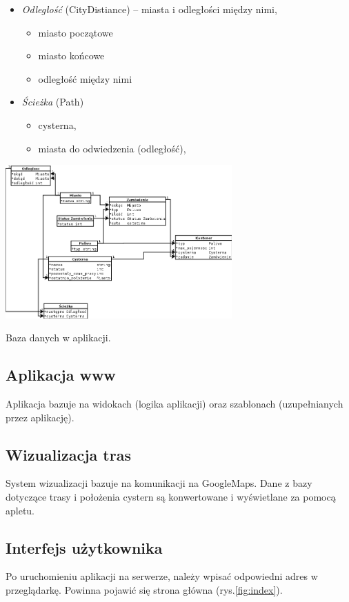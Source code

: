 \documentclass[11pt,a4paper,oneside]{mwart}
\begin{document}
\begin{itemize}
\begin{itemize}
    \end{itemize}
    \item \emph{Odległość} (CityDistiance) -- miasta i odległości między nimi,
    \begin{itemize}
      \item miasto początowe
      \item miasto końcowe
      \item odległość między nimi
    \end{itemize}
    \item \emph{Ścieżka} (Path) 
    \begin{itemize}
      \item cysterna,
      \item miasta do odwiedzenia (odległość),
    \end{itemize}
\end{itemize}

\begin{schemat}
  \centering
  \includegraphics[width=0.65\textwidth]{pics/baza.png}
  \caption{Baza danych w aplikacji.}
  \label{fig:baza}
\end{schemat}

\subsection{Aplikacja www}
Aplikacja bazuje na widokach (logika aplikacji) oraz szablonach (uzupełnianych przez aplikację).  

\subsection{Wizualizacja tras}

System wizualizacji bazuje na komunikacji na GoogleMaps. Dane z bazy dotyczące trasy i położenia cystern są konwertowane i wyświetlane za pomocą apletu. 

\subsection{Interfejs użytkownika}
Po uruchomieniu aplikacji na serwerze, należy wpisać odpowiedni adres w przeglądarkę. Powinna pojawić się strona główna (rys.\ref{fig:index}).
\end{document}
